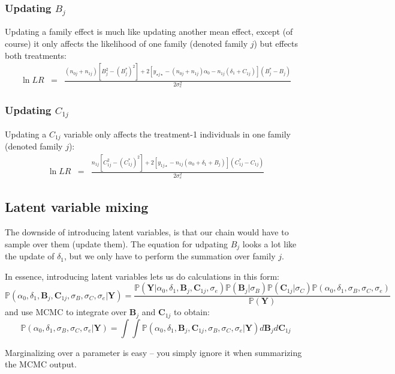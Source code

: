 \documentclass[11pt]{article}
\renewcommand{\Pr}{{\mathbb P}}
\begin{document}
\subsubsection*{Updating $B_j$}
Updating a family effect is much like updating another mean effect, except (of course) it only affects the likelihood of one family (denoted family $j$) but effects both treatments:
\begin{eqnarray*}
\ln LR & = & \frac{(n_{0j} + n_{1j})\left[B_j^2 - (B_j^{\ast})^2\right]  + 2\left[y_{\star j\star} - (n_{0j} + n_{1j})\alpha_0 - n_{1j}(\delta_1  + C_{1j})\right](B_j^\ast - B_j)}{2\sigma_e^2} 
\end{eqnarray*}

\subsubsection*{Updating $C_{1j}$}
Updating a $C_{1j}$ variable only affects the treatment-1 individuals in one family (denoted family $j$):
\begin{eqnarray*}
\ln LR & = & \frac{n_{1j}\left[C_{1j}^2 - (C_{1j}^{\ast})^2\right]  + 2\left[y_{1 j\star} - n_{1j}(\alpha_0 + \delta_1  + B_j)\right](C_{1j}^\ast - C_{1j})}{2\sigma_e^2} 
\end{eqnarray*}

\subsection{Latent variable mixing}
The downside of introducing latent variables, is that our chain would have to sample over them (update them).
The equation for udpating $B_j$ looks a lot like the update of $\delta_1$, but we only have to perform the summation over family $j$.


In essence, introducing latent variables lets us do calculations in this form:
$$\Pr(\alpha_0,\delta_1, \bm B_j, \bm C_{1j}, \sigma_B, \sigma_C, \sigma_e | \bm Y) = \frac{\Pr(\bm Y|\alpha_0,\delta_1, \bm B_j, \bm C_{1j}, \sigma_e)\Pr(\bm B_j|\sigma_B)\Pr(\bm C_{1j}|\sigma_C)\Pr(\alpha_0,\delta_1, \sigma_B, \sigma_C, \sigma_e)}{\Pr(\bm Y)} $$
and use MCMC to integrate over $\bm B_j$ and $\bm C_{1j}$ to obtain:
$$\Pr(\alpha_0,\delta_1, \sigma_B, \sigma_C, \sigma_e | \bm Y) = \int\int \Pr(\alpha_0,\delta_1, \bm B_j, \bm C_{1j}, \sigma_B, \sigma_C, \sigma_e | \bm Y) d \bm B_j d \bm C_{1j} $$

Marginalizing over a parameter is easy -- you simply ignore it when summarizing the MCMC output.


\newpage

\end{document}
